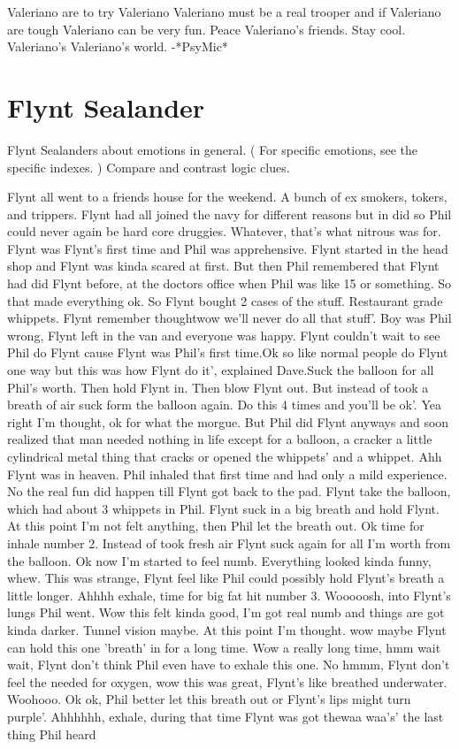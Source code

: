 \documentclass[12pt]{book}
\begin{document}
Valeriano are to try Valeriano Valeriano must be a real trooper and if Valeriano are tough Valeriano can be very fun. Peace Valeriano's friends. Stay cool. Valeriano's Valeriano's world. -*PsyMic*






\chapter{Flynt Sealander}




Flynt Sealanders about emotions in general. ( For specific emotions, see the specific indexes. ) Compare and contrast logic clues.



Flynt all went to a friends house for the weekend. A bunch of ex smokers, tokers, and trippers. Flynt had all joined the navy for different reasons but in did so Phil could never again be hard core druggies. Whatever, that's what nitrous was for. Flynt was Flynt's first time and Phil was apprehensive. Flynt started in the head shop and Flynt was kinda scared at first. But then Phil remembered that Flynt had did Flynt before, at the doctors office when Phil was like 15 or something. So that made everything ok. So Flynt bought 2 cases of the stuff. Restaurant grade whippets. Flynt remember thoughtwow we'll never do all that stuff'. Boy was Phil wrong, Flynt left in the van and everyone was happy. Flynt couldn't wait to see Phil do Flynt cause Flynt was Phil's first time.Ok so like normal people do Flynt one way but this was how Flynt do it', explained Dave.Suck the balloon for all Phil's worth. Then hold Flynt in. Then blow Flynt out. But instead of took a breath of air suck form the balloon again. Do this 4 times and you'll be ok'. Yea right I'm thought, ok for what the morgue. But Phil did Flynt anyways and soon realized that man needed nothing in life except for a balloon, a cracker a little cylindrical metal thing that cracks or opened the whippets' and a whippet. Ahh Flynt was in heaven. Phil inhaled that first time and had only a mild experience. No the real fun did happen till Flynt got back to the pad. Flynt take the balloon, which had about 3 whippets in Phil. Flynt suck in a big breath and hold Flynt. At this point I'm not felt anything, then Phil let the breath out. Ok time for inhale number 2. Instead of took fresh air Flynt suck again for all I'm worth from the balloon. Ok now I'm started to feel numb. Everything looked kinda funny, whew. This was strange, Flynt feel like Phil could possibly hold Flynt's breath a little longer. Ahhhh exhale, time for big fat hit number 3. Wooooosh, into Flynt's lungs Phil went. Wow this felt kinda good, I'm got real numb and things are got kinda darker. Tunnel vision maybe. At this point I'm thought. wow maybe Flynt can hold this one 'breath' in for a long time. Wow a really long time, hmm wait wait, Flynt don't think Phil even have to exhale this one. No hmmm, Flynt don't feel the needed for oxygen, wow this was great, Flynt's like breathed underwater. Woohooo. Ok ok, Phil better let this breath out or Flynt's lips might turn purple'. Ahhhhhh, exhale, during that time Flynt was got thewaa waa's' the last thing Phil heard 
\end{document}
